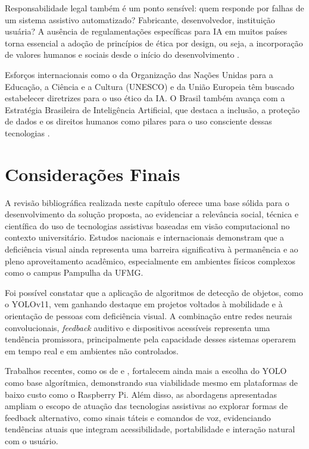 Responsabilidade legal também é um ponto sensível: quem responde por falhas de um sistema assistivo automatizado? Fabricante, desenvolvedor, instituição usuária? A ausência de regulamentações específicas para IA em muitos países torna essencial a adoção de princípios de ética por design, ou seja, a incorporação de valores humanos e sociais desde o início do desenvolvimento \cite{Dignum2019}.

Esforços internacionais como o da Organização das Nações Unidas para a Educação, a Ciência e a Cultura (UNESCO) e da União Europeia têm buscado estabelecer diretrizes para o uso ético da IA. O Brasil também avança com a Estratégia Brasileira de Inteligência Artificial, que destaca a inclusão, a proteção de dados e os direitos humanos como pilares para o uso consciente dessas tecnologias \cite{MCTI2021}.

\section{\textbf{Considerações Finais}}

A revisão bibliográfica realizada neste capítulo oferece uma base sólida para o desenvolvimento da solução proposta, ao evidenciar a relevância social, técnica e científica do uso de tecnologias assistivas baseadas em visão computacional no contexto universitário. Estudos nacionais e internacionais demonstram que a deficiência visual ainda representa uma barreira significativa à permanência e ao pleno aproveitamento acadêmico, especialmente em ambientes físicos complexos como o campus Pampulha da UFMG.

Foi possível constatar que a aplicação de algoritmos de detecção de objetos, como o YOLOv11, vem ganhando destaque em projetos voltados à mobilidade e à orientação de pessoas com deficiência visual. A combinação entre redes neurais convolucionais, \textit{feedback} auditivo e dispositivos acessíveis representa uma tendência promissora, principalmente pela capacidade desses sistemas operarem em tempo real e em ambientes não controlados.

Trabalhos recentes, como os de  e , fortalecem ainda mais a escolha do YOLO como base algorítmica, demonstrando sua viabilidade mesmo em plataformas de baixo custo como o Raspberry Pi. Além disso, as abordagens apresentadas ampliam o escopo de atuação das tecnologias assistivas ao explorar formas de feedback alternativo, como sinais táteis e comandos de voz, evidenciando tendências atuais que integram acessibilidade, portabilidade e interação natural com o usuário.

